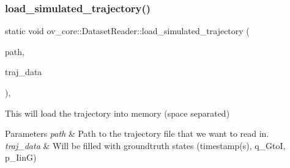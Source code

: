 \subsubsection{\texorpdfstring{load\+\_\+simulated\+\_\+trajectory()}{load\_simulated\_trajectory()}}
{\footnotesize\ttfamily static void ov\+\_\+core\+::\+Dataset\+Reader\+::load\+\_\+simulated\+\_\+trajectory (\begin{DoxyParamCaption}\item[{std\+::string}]{path,  }\item[{std\+::vector$<$ Eigen\+::\+Vector\+Xd $>$ \&}]{traj\+\_\+data }\end{DoxyParamCaption})\hspace{0.3cm}{\ttfamily [inline]}, {\ttfamily [static]}}



This will load the trajectory into memory (space separated) 


\begin{DoxyParams}{Parameters}
{\em path} & Path to the trajectory file that we want to read in. \\
\hline
{\em traj\+\_\+data} & Will be filled with groundtruth states (timestamp(s), q\+\_\+\+GtoI, p\+\_\+\+IinG) \\
\hline
\end{DoxyParams}
